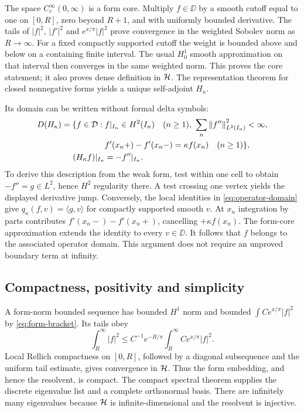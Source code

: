 The space $C_c^\infty(0,\infty)$ is a form core.
Multiply $f\in\DD$ by a smooth cutoff equal to one on $[0,R]$,
zero beyond $R+1$, and with uniformly bounded derivative.
The tails of $|f|^2$, $|f'|^2$ and $e^{x/\pi}|f|^2$ prove
convergence in the weighted Sobolev norm as $R\to\infty$.
For a fixed compactly supported cutoff the weight is bounded
above and below on a containing finite interval.
The usual $H^1_0$ smooth approximation on that interval then
converges in the same weighted norm.
This proves the core statement; it also proves dense definition
in $\mathcal{H}$.
The representation theorem for closed nonnegative forms yields
a unique self-adjoint $H_\kappa$.

Its domain can be written without formal delta symbols:
\begin{equation}
\begin{split}
D(H_\kappa)=\{f\in\mathcal{D}:\;& f|_{I_n}\in H^2(I_n)\quad(n\ge1),\
                      \sum_n\left\lVert f''\right\rVert_{L^2(I_n)}^2<\infty,\\
 &f'(x_n+)-f'(x_n-)=\kappa f(x_n)\quad(n\ge1)\},\\
(H_\kappa f)|_{I_n}&=-f''|_{I_n}.
\end{split}
\label{eq:operator-domain}
\end{equation}
To derive this description from the weak form, test within one
cell to obtain $-f''=g\in L^2$, hence $H^2$ regularity there.
A test crossing one vertex yields the displayed derivative jump.
Conversely, the local identities in \eqref{eq:operator-domain}
give $q_\kappa(f,v)=\langle g,v\rangle$ for compactly supported
smooth $v$. At $x_n$ integration by parts contributes
$f'(x_n-)-f'(x_n+)$, cancelling $+\kappa f(x_n)$.
The form-core approximation extends the identity to every
$v\in\DD$. It follows that $f$ belongs to the associated
operator domain. This argument does not require an unproved
boundary term at infinity.

\subsection{Compactness, positivity and simplicity}

A form-norm bounded sequence has bounded $H^1$ norm and
bounded $\int Ce^{x/\pi}|f|^2$ by \eqref{eq:form-bracket}.
Its tails obey
\begin{equation}
\int_R^\infty |f|^2
\le C^{-1}e^{-R/\pi}\int_R^\infty Ce^{x/\pi}|f|^2.
\label{eq:compact-tail}
\end{equation}
Local Rellich compactness on $[0,R]$, followed by a diagonal
subsequence and the uniform tail estimate, gives convergence
in $\mathcal{H}$. Thus the form embedding, and hence the resolvent,
is compact.
The compact spectral theorem supplies the discrete eigenvalue
list and a complete orthonormal basis.
There are infinitely many eigenvalues because $\mathcal{H}$ is
infinite-dimensional and the resolvent is injective.

